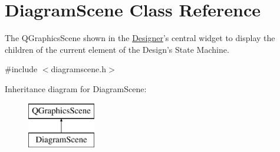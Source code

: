 \hypertarget{class_diagram_scene}{\section{Diagram\-Scene Class Reference}
\label{class_diagram_scene}
}


The Q\-Graphics\-Scene shown in the \hyperlink{class_designer}{Designer}'s central widget to display the children of the current element of the Design's State Machine.  




{\ttfamily \#include $<$diagramscene.\-h$>$}

Inheritance diagram for Diagram\-Scene\-:\begin{figure}[H]
\begin{center}
\leavevmode
\includegraphics[height=2.000000cm]{class_diagram_scene}
\end{center}
\end{figure}
